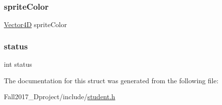 \subsubsection{\texorpdfstring{sprite\+Color}{spriteColor}}
{\footnotesize\ttfamily \hyperlink{struct_vector4_d}{Vector4D} sprite\+Color}

\mbox{\label{struct_student_a6e27f49150e9a14580fb313cc2777e00}} 
\subsubsection{\texorpdfstring{status}{status}}
{\footnotesize\ttfamily int status}



The documentation for this struct was generated from the following file\+:\begin{DoxyCompactItemize}
\item 
Fall2017\+\_\+Dproject/include/\hyperlink{student_8h}{student.\+h}\end{DoxyCompactItemize}
